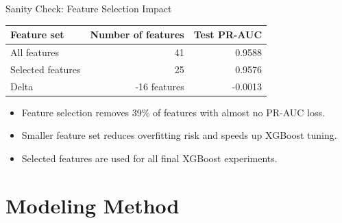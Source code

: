 \documentclass{beamer}
\begin{document}
\begin{frame}{Sanity Check: Feature Selection Impact}
    \begin{table}
        \centering
        \small
        \begin{tabular}{lrr}
            \toprule
            \textbf{Feature set} & \textbf{Number of features} & \textbf{Test PR-AUC} \\
            \midrule
            All features & 41 & 0.9588 \\
            Selected features & 25 & 0.9576 \\
            \midrule
            Delta & -16 features & -0.0013 \\
            \bottomrule
        \end{tabular}
    \end{table}

    \vspace{0.3cm}
    \begin{itemize}
        \item Feature selection removes 39\% of features with almost no PR-AUC loss.
        \item Smaller feature set reduces overfitting risk and speeds up XGBoost tuning.
        \item Selected features are used for all final XGBoost experiments.
    \end{itemize}
\end{frame}

\section{Modeling Method}
\end{document}
